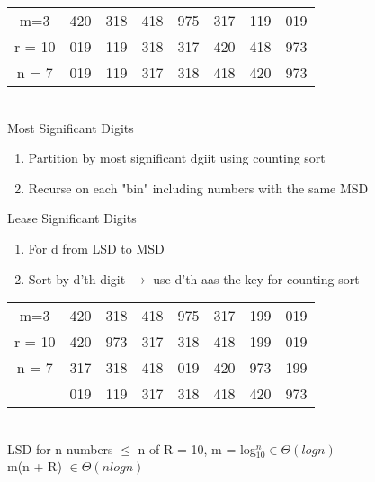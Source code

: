 \documentclass[12pt]{article}
\begin{document}
	\begin{tabular}{c | c | c | c | c | c | c | c }
		m=3 & 420 & 318 & 418 & 975 & 317 & 119 & 019 \\
		r = 10 & 019 & 119 & 318 & 317 & 420 & 418 & 973 \\
		n = 7 & 019 & 119 & 317 & 318 & 418 & 420 & 973 \\
	\end{tabular}\\
	
	Most Significant Digits\\
	\begin{enumerate}
		\item Partition by most significant dgiit using counting sort
		\item Recurse on each "bin" including numbers with the same MSD
	\end{enumerate}
	
	Lease Significant Digits\\
	\begin{enumerate}
		\item For d from LSD to MSD
		\item Sort by d'th digit $\rightarrow$ use d'th aas the key for counting sort
	\end{enumerate}
	\begin{tabular}{c | c | c | c | c | c | c | c }
		m=3    & 420 & 318 & 418 & 975 & 317 & 199 & 019 \\
		r = 10 & 420 & 973 & 317 & 318 & 418 & 199 & 019 \\
		n = 7  & 317 & 318 & 418 & 019 & 420 & 973 & 199 \\
		       & 019 & 119 & 317 & 318 & 418 & 420 & 973 \\
	\end{tabular}\\
	
	LSD for n numbers $\leq$ n of R = 10, m = log$_{10}^n \in \Theta(logn)$\\
	m(n + R) $\in \Theta(nlogn)$\\
	
	
\end{document}
